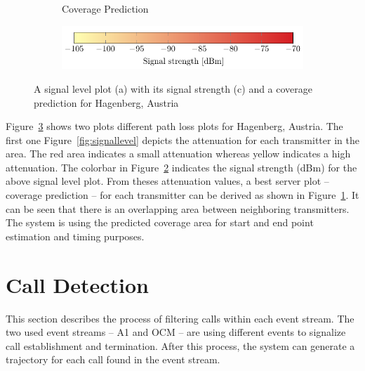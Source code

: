 \documentclass[master,english]{hgbthesis}
\begin{document}
\begin{figure}
\begin{subfigure}[b]{0.45\textwidth}
		\caption{Coverage Prediction}
		\label{fig:coveragepred}
	\end{subfigure}
\begin{subfigure}[b]{\textwidth}
		\includegraphics[width=\textwidth]{tikz/signallevelbar}
		\caption{}
		\label{fig:signallevelbar}
	\end{subfigure}
	\caption{A signal level plot (a) with its signal strength (c) and a coverage prediction for Hagenberg, Austria }
	\label{fig:cellarea}
\end{figure}
Figure~\ref{fig:cellarea} shows two plots different path loss plots for Hagenberg, Austria. The first one Figure~\ref{fig:signallevel} depicts the attenuation for each transmitter in the area. The red area indicates a small attenuation whereas yellow indicates a high attenuation. The colorbar in Figure~\ref{fig:signallevelbar} indicates the signal strength (dBm) for the above signal level plot.
%
From theses attenuation values, a best server plot -- coverage prediction -- for each transmitter can be derived as shown in Figure~\ref{fig:coveragepred}. It can be seen that there is an overlapping area between neighboring transmitters. The system is using the predicted coverage area for start and end point estimation and timing purposes.
\section{Call Detection}
This section describes the process of filtering calls within each event stream. The two used event streams -- A1 and OCM -- are using different events to signalize call establishment and termination. After this process, the system can generate a trajectory for each call found in the event stream.
\end{document}
